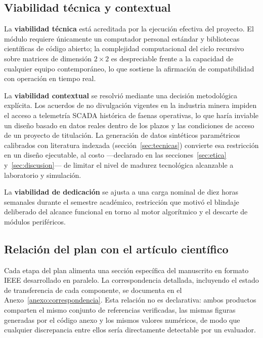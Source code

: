 \subsection{Viabilidad técnica y contextual}

La \textbf{viabilidad técnica} está acreditada por la ejecución efectiva del
proyecto. El módulo requiere únicamente un computador personal estándar y
bibliotecas científicas de código abierto; la complejidad computacional del
ciclo recursivo sobre matrices de dimensión $2\times2$ es despreciable frente a
la capacidad de cualquier equipo contemporáneo, lo que sostiene la afirmación de
compatibilidad con operación en tiempo real.

La \textbf{viabilidad contextual} se resolvió mediante una decisión metodológica
explícita. Los acuerdos de no divulgación vigentes en la industria minera
impiden el acceso a telemetría SCADA histórica de faenas operativas, lo que
haría inviable un diseño basado en datos reales dentro de los plazos y las
condiciones de acceso de un proyecto de titulación. La generación de datos
sintéticos paramétricos calibrados con literatura indexada
(sección~\ref{sec:tecnicas}) convierte esa restricción en un diseño ejecutable,
al costo —declarado en las secciones~\ref{sec:etica} y~\ref{sec:discusion}— de
limitar el nivel de madurez tecnológica alcanzable a laboratorio y simulación.

La \textbf{viabilidad de dedicación} se ajusta a una carga nominal de diez horas
semanales durante el semestre académico, restricción que motivó el blindaje
deliberado del alcance funcional en torno al motor algorítmico y el descarte de
módulos periféricos.

\subsection{Relación del plan con el artículo científico}

Cada etapa del plan alimenta una sección específica del manuscrito en formato
IEEE desarrollado en paralelo. La correspondencia detallada, incluyendo el
estado de transferencia de cada componente, se documenta en el
Anexo~\ref{anexo:correspondencia}. Esta relación no es declarativa: ambos
productos comparten el mismo conjunto de referencias verificadas, las mismas
figuras generadas por el código anexo y los mismos valores numéricos, de modo
que cualquier discrepancia entre ellos sería directamente detectable por un
evaluador.
